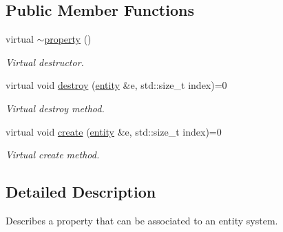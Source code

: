 \subsection*{Public Member Functions}
\begin{DoxyCompactItemize}
\item 
\hypertarget{classophidian_1_1entity_1_1property_a0fc51c3735e4d44e0460aeca0ffc843f}{virtual \hyperlink{classophidian_1_1entity_1_1property_a0fc51c3735e4d44e0460aeca0ffc843f}{$\sim$property} ()}\label{classophidian_1_1entity_1_1property_a0fc51c3735e4d44e0460aeca0ffc843f}

\begin{DoxyCompactList}\small\item\em Virtual destructor. \end{DoxyCompactList}\item 
virtual void \hyperlink{classophidian_1_1entity_1_1property_a41d49c84d20e3bc9cba0162c9aba6f2b}{destroy} (\hyperlink{classophidian_1_1entity_1_1entity}{entity} \&e, std\-::size\-\_\-t index)=0
\begin{DoxyCompactList}\small\item\em Virtual destroy method. \end{DoxyCompactList}\item 
virtual void \hyperlink{classophidian_1_1entity_1_1property_a25f0188c1d920cbdb55583772b4817ce}{create} (\hyperlink{classophidian_1_1entity_1_1entity}{entity} \&e, std\-::size\-\_\-t index)=0
\begin{DoxyCompactList}\small\item\em Virtual create method. \end{DoxyCompactList}\end{DoxyCompactItemize}


\subsection{Detailed Description}
Describes a property that can be associated to an entity system. 

